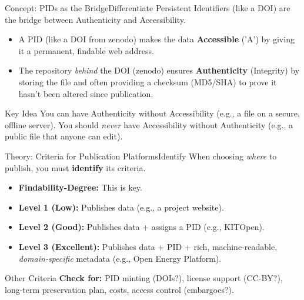 \begin{frame}{Concept: PIDs as the Bridge}{Differentiate}
    Persistent Identifiers (like a DOI) are the bridge between Authenticity and Accessibility.
    
    \begin{itemize}
        \item A PID (like a DOI from zenodo) makes the data \textbf{Accessible} ('A') by giving it a permanent,
        findable web address.
        \pause
        \item The repository \textit{behind} the DOI (zenodo) ensures \textbf{Authenticity} (Integrity) by storing the
        file and often providing a checksum (MD5/SHA) to prove it hasn't been altered since publication.
    \end{itemize}
    \pause
    \begin{block}{Key Idea}
        You can have Authenticity without Accessibility (e.g., a file on a secure, offline server).
        \pause
        You should \textit{never} have Accessibility without Authenticity (e.g., a public file that anyone can edit).
    \end{block}
\end{frame}

\begin{frame}{Theory: Criteria for Publication Platforms}{Identify}
    When choosing \textit{where} to publish, you must \textbf{identify} its criteria.
    \begin{itemize}
        \item \textbf{Findability-Degree:} This is key.
        \pause
        \item \textbf{Level 1 (Low):} Publishes data (e.g., a project website).
        \pause
        \item \textbf{Level 2 (Good):} Publishes data + assigns a PID (e.g., KITOpen).
        \pause
        \item \textbf{Level 3 (Excellent):} Publishes data + PID + rich, machine-readable, \emph{domain-specific} metadata (e.g., Open Energy Platform).
    \end{itemize}
    \pause
    \begin{block}{Other Criteria}
        \textbf{Check for:} PID minting (DOIs?), license support (CC-BY?), long-term preservation plan, costs, access control (embargoes?).
    \end{block}
\end{frame}

